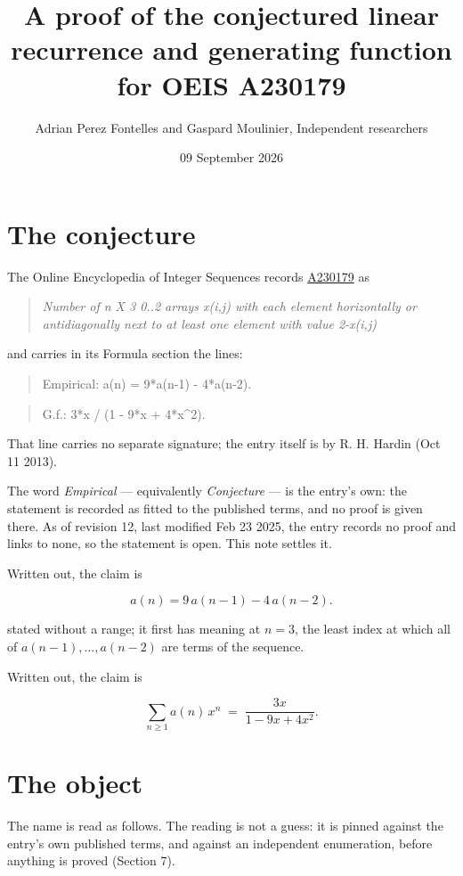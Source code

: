 \documentclass[11pt]{article}
\title{A proof of the conjectured linear recurrence and generating function for OEIS A230179}
\author{Adrian Perez Fontelles and Gaspard Moulinier, Independent researchers}
\date{09 September 2026}
\theoremstyle{definition}
\begin{document}
\maketitle
\section{The conjecture}

The Online Encyclopedia of Integer Sequences records \href{https://oeis.org/A230179}{A230179} as

\begin{quote}\itshape Number of n X 3 0..2 arrays x(i,j) with each element horizontally or antidiagonally next to at least one element with value 2-x(i,j)\end{quote}

and carries in its Formula section the lines:

\begin{quote}\ttfamily Empirical: a(n) = 9*a(n-1) - 4*a(n-2).\end{quote}

\begin{quote}\ttfamily G.f.: 3*x / (1 - 9*x + 4*x\textasciicircum{}2).\end{quote}

That line carries no separate signature; the entry itself is by R. H. Hardin (Oct 11 2013).

The word {\itshape Empirical} --- equivalently {\itshape Conjecture} --- is the entry's own: the statement is recorded as fitted to the published terms, and no proof is given there. As of revision 12, last modified Feb 23 2025, the entry records no proof and links to none, so the statement is open. This note settles it.

Written out, the claim is

\[a(n) = 9\,a(n-1) - 4\,a(n-2).\]

stated without a range; it first has meaning at $n = 3$, the least index at which all of $a(n-1),\dots,a(n-2)$ are terms of the sequence.

Written out, the claim is

\[\sum_{n \ge 1} a(n)\,x^n \;=\; \frac{3x}{1 - 9x + 4x^{2}}.\]

\section{The object}

The name is read as follows. The reading is not a guess: it is pinned against the entry's own published terms, and against an independent enumeration, before anything is proved (Section 7).
\end{document}
